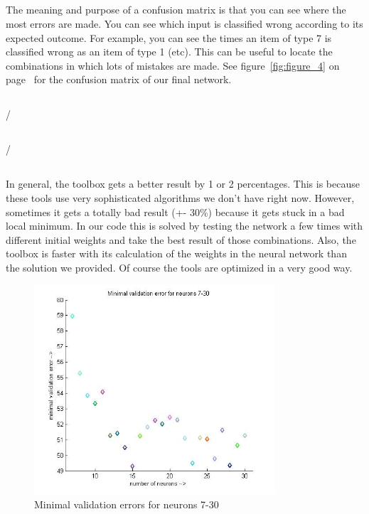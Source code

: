 \documentclass{scrartcl}
\begin{document}
\subsection{}
The meaning and purpose of a confusion matrix is that you can see where the most errors are made. You can see which input is classified wrong according to its expected outcome. For example, you can see the times an item of type 7 is classified wrong as an item of type 1 (etc). This can be useful to locate the combinations in which lots of mistakes are made. See figure~\ref{fig:figure_4} on page~\pageref{fig:figure_4} for the confusion matrix of our final network.

\subsection{}
/

\subsection{}
/

\subsection{}
In general, the toolbox gets a better result by 1 or 2 percentages. This is because these tools use very sophisticated algorithms we don't have right now. However, sometimes it gets a totally bad result (+- 30\%) because it gets stuck in a bad local minimum. In our code this is solved by testing the network a few times with different initial weights and take the best result of those combinations. Also, the toolbox is faster with its calculation of the weights in the neural network than the solution we provided. Of course the tools are optimized in a very good way.

\pagebreak


\begin{figure}[p]
    \centering
    \includegraphics[width=0.8\textwidth]{Plot_Validation_Error.jpg}
    \caption{Minimal validation errors for neurons 7-30}
    \label{fig:figure_1}
\end{figure}
\end{document}
